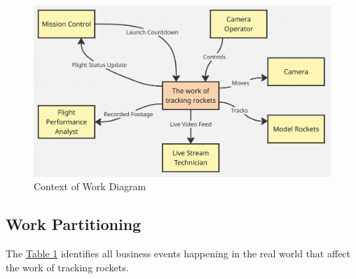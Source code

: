 \documentclass[12pt]{article}
\begin{document}
\begin{figure}[H]
  \centering
  \includegraphics[width=\textwidth,height=\textheight,keepaspectratio]{../Images/context_of_work.png}
  \caption{Context of Work Diagram}
  \label{img:context-of-work}
\end{figure}

\subsection{Work Partitioning}

The \hyperref[tab:work-part]{Table 1} identifies all business events happening
in the real world that affect the work of tracking rockets.
\end{document}

